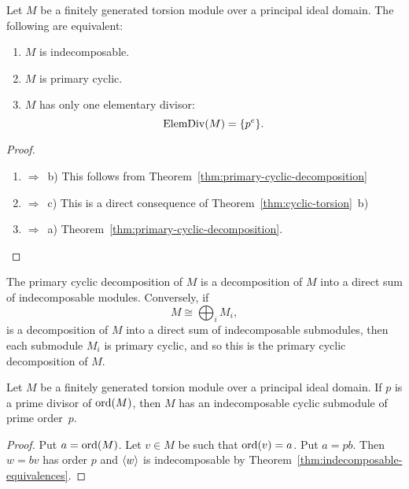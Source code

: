 \begin{thm}\label{thm:indecomposable-equivalences}
    Let\/ $M$ be a finitely generated torsion module over a principal ideal domain. The following are equivalent:  
    \begin{enumerate}[\rm a)]
        \item $M$ is indecomposable.  
        \item $M$ is primary cyclic.  
        \item $M$ has only one elementary divisor:  
        $$
            \operatorname{ElemDiv}(M) = \{p^e\}.
        $$
    \end{enumerate}
\end{thm}

\begin{proof}${}$
    \begin{enumerate}[\rm a)]
        \item $\Rightarrow$~b) This follows from Theorem~\ref{thm:primary-cyclic-decomposition}

        \item $\Rightarrow$~c) This is a direct consequence of Theorem~\ref{thm:cyclic-torsion}~b)

        \item $\Rightarrow$~a) Theorem~\ref{thm:primary-cyclic-decomposition}.
    \end{enumerate}
\end{proof}

\begin{cor}
    The primary cyclic decomposition of\/ $M$ is a decomposition of\/ $M$ into a direct sum of indecomposable modules. Conversely, if  
    $$
        M \cong \bigoplus_{i} M_i,
    $$  
    is a decomposition of\/ $M$ into a direct sum of indecomposable submodules, then each submodule\/ $M_i$ is primary cyclic, and so this is the primary cyclic decomposition of\/ $M$.
\end{cor}

\begin{thm}\label{thm:prime-factors-of-ord-have-submodules}
    Let\/ $M$ be a finitely generated torsion module over a principal ideal domain. If\/ $p$ is a prime divisor of\/ $\operatorname{ord}(M)$, then\/ $M$ has an indecomposable cyclic submodule of prime order\/~$p$.
\end{thm}

\begin{proof}
    Put $a=\operatorname{ord}(M)$. Let $v\in M$ be such that $\operatorname{ord}(v)=a$. Put $a=pb$. Then $w=bv$ has order $p$ and $\langle w\rangle$ is indecomposable by Theorem~\ref{thm:indecomposable-equivalences}.
\end{proof}



